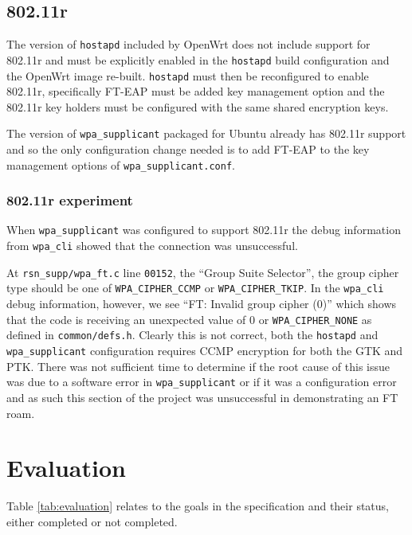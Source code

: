 \documentclass[pdftex, 12pt, a4paper]{article}
\begin{document}

\subsection{802.11r}

The version of \verb`hostapd` included by OpenWrt does not include support for 802.11r and must be explicitly enabled in the \verb`hostapd` build configuration and the OpenWrt image re-built.  \verb`hostapd` must then be reconfigured to enable 802.11r, specifically FT-EAP must be added key management option and the 802.11r key holders must be configured with the same shared encryption keys.

The version of \verb`wpa_supplicant` packaged for Ubuntu already has 802.11r support and so the only configuration change needed is to add FT-EAP to the key management options of \verb`wpa_supplicant.conf`.

\subsubsection{802.11r experiment}
When \verb`wpa_supplicant` was configured to support 802.11r the debug information from \verb`wpa_cli` showed that the connection was unsuccessful.

At \verb`rsn_supp/wpa_ft.c` line \verb`00152`, the ``Group Suite Selector'', the group cipher type should be one of \verb`WPA_CIPHER_CCMP` or \verb`WPA_CIPHER_TKIP`.  In the \verb`wpa_cli` debug information, however, we see ``FT: Invalid group cipher (0)'' which shows that the code is receiving an unexpected value of 0 or \verb`WPA_CIPHER_NONE` as defined in \verb`common/defs.h`.  Clearly this is not correct, both the \verb`hostapd` and \verb`wpa_supplicant` configuration requires CCMP encryption for both the GTK and PTK. There was not sufficient time to determine if the root cause of this issue was due to a software error in \verb`wpa_supplicant` or if it was a configuration error and as such this section of the project was unsuccessful in demonstrating an FT roam.

\section{Evaluation}
Table \ref{tab:evaluation} relates to the goals in the specification and their status, either completed or not completed.
\end{document}
